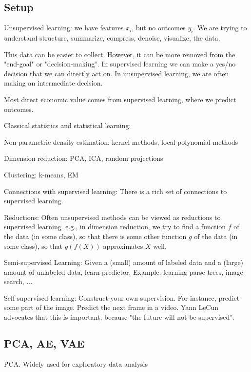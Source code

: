 \documentclass[english]{article}
\begin{document}
\subsection{Setup}

\benum
\item Unsupervised learning: we have features $x_i$, but no outcomes $y_i$. We are trying to understand structure, summarize, compress, denoise, visualize, the data.

This data can be easier to collect. However, it can be more removed from the "end-goal" or "decision-making". In supervised learning we can make a yes/no decision that we can directly act on. In unsupervised learning, we are often making an intermediate decision. 

Most direct economic value comes from supervised learning, where we predict outcomes.


\item Classical statistics and statistical learning: 

Non-parametric density estimation: kernel methods, local polynomial methods

Dimension reduction: PCA, ICA, random projections

Clustering: k-means, EM


\item Connections with supervised learning: There is a rich set of connections to supervised learning. 

Reductions: Often unsupervised methods can be viewed as reductions to supervised learning. e.g., in dimension reduction, we try to find a function $f$ of the data (in some class), so that there is some other function $g$ of the data (in some class), so that $g(f(X))$ approximates $X$ well. 

Semi-supervised Learning: Given a (small) amount of labeled data and a (large) amount of unlabeled data, learn predictor. Example: learning parse trees, image search, ...

Self-supervised learning: Construct your own supervision. For instance, predict some part of the image. Predict the next frame in a video. Yann LeCun advocates that this is important, because "the future will not be supervised".

\eenum 

\subsection{PCA, AE, VAE}


\benum
\item PCA. Widely used for exploratory data analysis
\end{document}
